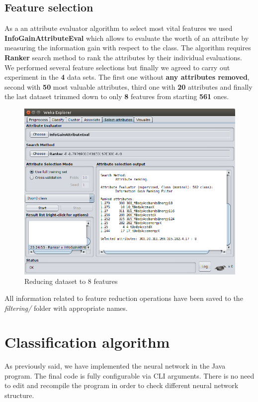 \documentclass[12pt,a4paper]{article}
\begin{document}
\subsection{Feature selection}
As a an attribute evaluator algorithm to select most vital features we used \textbf{InfoGainAttributeEval} which allows to evaluate the worth of an attribute by measuring the information gain with respect to the class. The algorithm requires \textbf{Ranker} search method to rank the attributes by their individual evaluations.\\
We performed several feature selections but finally we agreed to carry out experiment in the \textbf{4} data sets. The first one without \textbf{any attributes removed}, second with \textbf{50} most valuable attributes, third one with \textbf{20} attributes and finally the last dataset trimmed down to only \textbf{8} features from starting \textbf{561} ones. \\
\begin{figure}[H]
\centering
\includegraphics[scale=0.3]{img/Weka3.png}
\caption{Reducing dataset to 8 features}
\end{figure}
All information related to feature reduction operations have been saved to the \textit{filtering/} folder with appropriate names.

\section{Classification algorithm}
As previously said, we have implemented the neural network in the Java program. The final code is fully configurable via CLI arguments. There is no need to edit and recompile the program in order to check different neural network structure.
\end{document}
